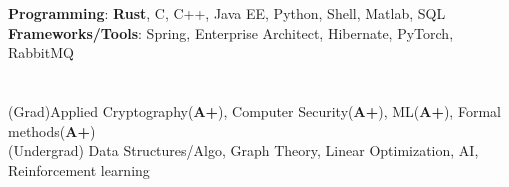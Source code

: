 \documentclass[margin,line]{resume}
\begin{document}
\begin{resume}


\section{}
\textbf{Programming}: \textbf{Rust}, C, C++, Java EE, Python, Shell, Matlab, SQL \\
\textbf{Frameworks/Tools}: Spring, Enterprise Architect, Hibernate, PyTorch, RabbitMQ   
 
\vspace{-3mm}

\section{}
(Grad)Applied Cryptography(\textbf{A+}), Computer Security(\textbf{A+}), ML(\textbf{A+}), Formal methods(\textbf{A+})\\
(Undergrad) Data Structures/Algo, Graph Theory, Linear Optimization, AI, Reinforcement learning
\vspace{-7mm}

\end{resume}
\end{document}
